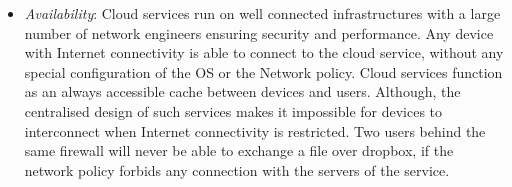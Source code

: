 \begin{itemize}

\item {\it Availability}: Cloud services run on well connected infrastructures
      with a large number of network engineers ensuring security and
      performance.  Any device with Internet connectivity is able to connect to
      the cloud service, without any special configuration of the OS or the
      Network policy. Cloud services function as an always accessible cache
      between devices and users.  Although, the centralised design of such
      services makes it impossible for devices to interconnect when Internet
      connectivity is restricted. Two users behind the same firewall will never
      be able to exchange a file over dropbox, if the network policy forbids any
      connection with the servers of the service. 
\end{itemize}


